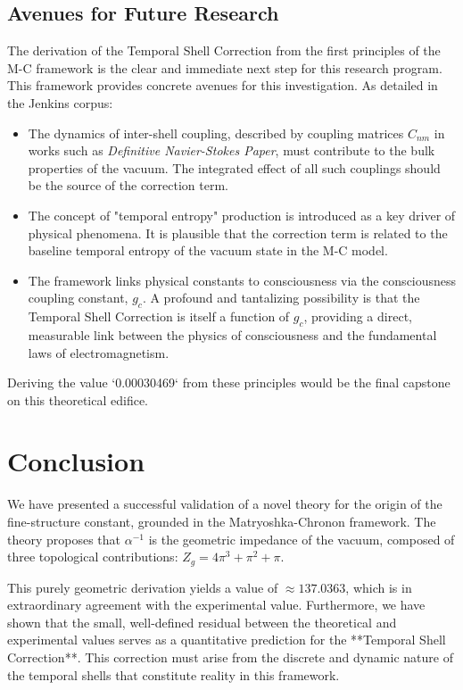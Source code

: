 \documentclass[11pt,a4paper]{article}
\begin{document}
\subsection{Avenues for Future Research}
The derivation of the Temporal Shell Correction from the first principles of the M-C framework is the clear and immediate next step for this research program. This framework provides concrete avenues for this investigation. As detailed in the Jenkins corpus:
\begin{itemize}
    \item The dynamics of inter-shell coupling, described by coupling matrices $C_{nm}$ in works such as \textit{Definitive Navier-Stokes Paper}, must contribute to the bulk properties of the vacuum. The integrated effect of all such couplings should be the source of the correction term.
    \item The concept of "temporal entropy" production is introduced as a key driver of physical phenomena. It is plausible that the correction term is related to the baseline temporal entropy of the vacuum state in the M-C model.
    \item The framework links physical constants to consciousness via the consciousness coupling constant, $g_c$. A profound and tantalizing possibility is that the Temporal Shell Correction is itself a function of $g_c$, providing a direct, measurable link between the physics of consciousness and the fundamental laws of electromagnetism.
\end{itemize}
Deriving the value `0.00030469` from these principles would be the final capstone on this theoretical edifice.

\section{Conclusion}
We have presented a successful validation of a novel theory for the origin of the fine-structure constant, grounded in the Matryoshka-Chronon framework. The theory proposes that $\alpha^{-1}$ is the geometric impedance of the vacuum, composed of three topological contributions: $Z_g = 4\pi^3 + \pi^2 + \pi$.

This purely geometric derivation yields a value of $\approx 137.0363$, which is in extraordinary agreement with the experimental value. Furthermore, we have shown that the small, well-defined residual between the theoretical and experimental values serves as a quantitative prediction for the **Temporal Shell Correction**. This correction must arise from the discrete and dynamic nature of the temporal shells that constitute reality in this framework.
\end{document}
